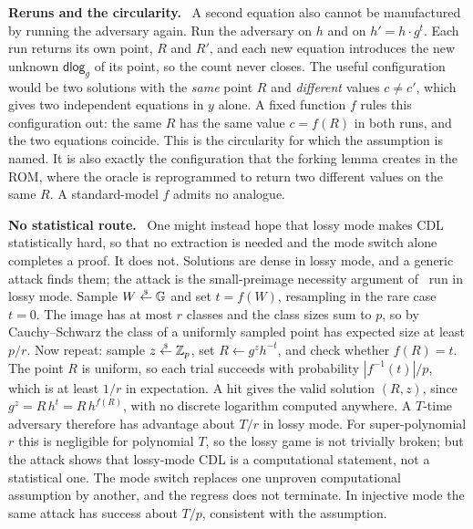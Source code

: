 \documentclass[11pt]{article}
\newcommand{\GG}{\mathbb{G}}
\newcommand{\Zp}{\mathbb{Z}_p}
\newcommand{\getsr}{\mathrel{\stackrel{\raisebox{-1pt}{\tiny\$}}{\gets}}}
\newcommand{\dlog}{\mathsf{dlog}}
\newcommand{\heading}[1]{\medskip\noindent\textbf{#1}\ }
\begin{document}
\heading{Reruns and the circularity.}
A second equation also cannot be manufactured by running the adversary again. Run the adversary on $h$ and on $h' = h \cdot g^{t}$. Each run returns its own point, $R$ and $R'$, and each new equation introduces the new unknown $\dlog_g$ of its point, so the count never closes. The useful configuration would be two solutions with the \emph{same} point $R$ and \emph{different} values $c \ne c'$, which gives two independent equations in $y$ alone. A fixed function $f$ rules this configuration out: the same $R$ has the same value $c = f(R)$ in both runs, and the two equations coincide. This is the circularity for which the assumption is named. It is also exactly the configuration that the forking lemma creates in the ROM, where the oracle is reprogrammed to return two different values on the same $R$. A standard-model $f$ admits no analogue.

\heading{No statistical route.}
One might instead hope that lossy mode makes CDL statistically hard, so that no extraction is needed and the mode switch alone completes a proof. It does not. Solutions are dense in lossy mode, and a generic attack finds them; the attack is the small-preimage necessity argument of~\cite{CFOS25} run in lossy mode. Sample $W \getsr \GG$ and set $t = f(W)$, resampling in the rare case $t = 0$. The image has at most $r$ classes and the class sizes sum to $p$, so by Cauchy--Schwarz the class of a uniformly sampled point has expected size at least $p/r$. Now repeat: sample $z \getsr \Zp$, set $R \gets g^{z} h^{-t}$, and check whether $f(R) = t$. The point $R$ is uniform, so each trial succeeds with probability $|f^{-1}(t)|/p$, which is at least $1/r$ in expectation. A hit gives the valid solution $(R, z)$, since $g^{z} = R\, h^{t} = R\, h^{f(R)}$, with no discrete logarithm computed anywhere. A $T$-time adversary therefore has advantage about $T/r$ in lossy mode. For super-polynomial $r$ this is negligible for polynomial $T$, so the lossy game is not trivially broken; but the attack shows that lossy-mode CDL is a computational statement, not a statistical one. The mode switch replaces one unproven computational assumption by another, and the regress does not terminate. In injective mode the same attack has success about $T/p$, consistent with the assumption.
\end{document}
